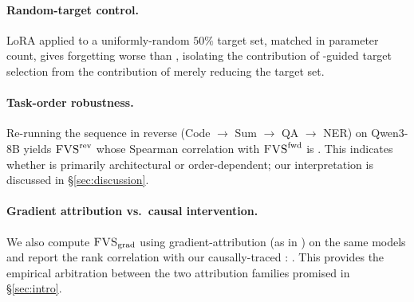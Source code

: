 \paragraph{Random-target control.} LoRA applied to a uniformly-random $50\%$ target set, matched in parameter count, gives forgetting  worse than \tglora{}, isolating the contribution of \fvs{}-guided target selection from the contribution of merely reducing the target set.

\paragraph{Task-order robustness.} Re-running the sequence in reverse (Code $\rightarrow$ Sum $\rightarrow$ QA $\rightarrow$ NER) on Qwen3-8B yields $\textsc{FVS}^{\mathrm{rev}}$ whose Spearman correlation with $\textsc{FVS}^{\mathrm{fwd}}$ is . This indicates whether \fvs{} is primarily architectural or order-dependent; our interpretation is discussed in \S\ref{sec:discussion}.

\paragraph{Gradient attribution vs.\ causal intervention.} We also compute $\textsc{FVS}_{\mathrm{grad}}$ using gradient-attribution (as in \citet{anon2026mechforget}) on the same models and report the rank correlation with our causally-traced \fvs{}: . This provides the empirical arbitration between the two attribution families promised in \S\ref{sec:intro}.
